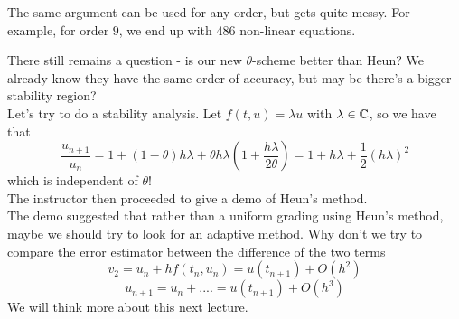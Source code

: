 \documentclass{article}
\begin{document}
\begin{remark}
    The same argument can be used for any order, but gets quite messy. For example, for order $9$, we end up with $486$ non-linear equations.
\end{remark}

There still remains a question - is our new $\theta$-scheme better than Heun? We already know they have the same order of accuracy, but may be there's a bigger stability region?\\

Let's try to do a stability analysis. Let $f(t, u) = \lambda u$ with $\lambda \in \mathbb{C}$, so we have that
\[\frac{u_{n+1}}{u_n} = 1 + (1 - \theta) h \lambda + \theta h \lambda (1 + \frac{h \lambda}{2 \theta}) = 1 + h \lambda + \frac{1}{2} (h \lambda)^2\]
which is independent of $\theta$!\\

The instructor then proceeded to give a demo of Heun's method.\\

The demo suggested that rather than a uniform grading using Heun's method, maybe we should try to look for an adaptive method. Why don't we try to compare the error estimator between the difference of the two terms
\[v_2 = u_n + h f(t_n,u_n) = u(t_{n+1}) + O(h^2)\]
\[u_{n+1} = u_n + .... = u(t_{n+1}) + O(h^3)\]
We will think more about this next lecture.
\end{document}
